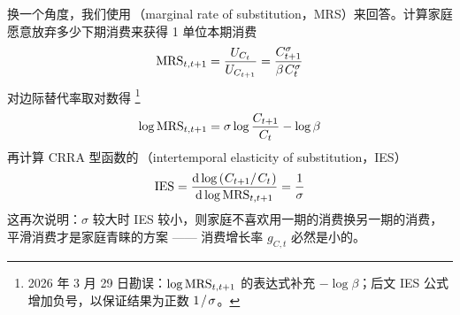 换一个角度，我们使用\,（marginal rate of substitution，MRS）来回答。计算家庭愿意放弃多少下期消费来获得 1 单位本期消费
\begin{equation*}
    \text{MRS}_{t,t+1}=\dfrac{U_{C_t}}{U_{C\nt}}=\dfrac{C^{\sigma}\nt}{\beta\,C_t^{\sigma}}
\end{equation*}
对边际替代率取对数得 \footnote{2026 年 3 月 29 日勘误：\(\operatorname{log}\text{MRS}_{t,t+1}\) 的表达式补充 \(-\log\beta\)；后文 IES 公式增加负号，以保证结果为正数 \(1{\mspace{2mu}}/{\mspace{2mu}}\sigma\)。}
\begin{align*}
    \operatorname{log}\text{MRS}_{t,t+1}=\sigma\operatorname{log}\dfrac{C_{t+1}}{C_t}-\operatorname{log}\beta
\end{align*}
再计算 CRRA 型函数的\,（intertemporal elasticity of substitution，IES）
\begin{align*}
    \text{IES}=\dfrac{\n{d}\log\bka{C\nt/\,C_t}}{\n{d}\log\n{MRS}_{t,t+1}}=\dfrac1\sigma
\end{align*}
这再次说明：\(\sigma\) 较大时 IES 较小，则家庭不喜欢用一期的消费换另一期的消费，平滑消费才是家庭青睐的方案 —— 消费增长率 \(g_{C,t}\) 必然是小的。



\SymmetricGeometry
